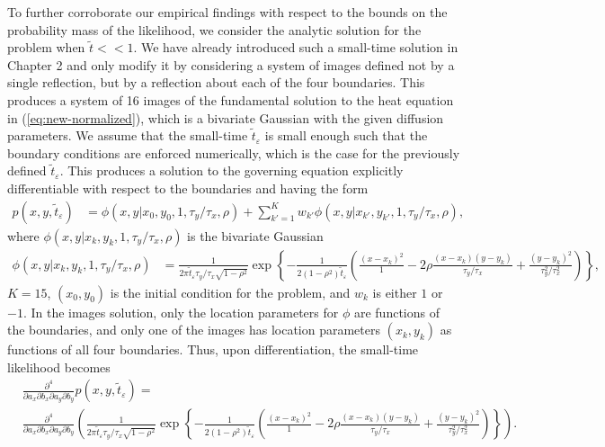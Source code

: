 \documentclass[10pt]{article}
\begin{document}
\begin{enumerate}
To further corroborate our empirical findings with respect to the
bounds on the probability mass of the likelihood, we consider the
analytic solution for the problem when $\tilde{t} << 1$. We have
already introduced such a small-time solution in Chapter 2
and only modify it by considering a system of images defined not by a
single reflection, but by a reflection about each of the four
boundaries. This produces a system of 16 images of the fundamental
solution to the heat equation in (\ref{eq:new-normalized}), which is a
bivariate Gaussian with the given diffusion parameters.  We assume
that the small-time $\tilde{t}_{\varepsilon}$ is small enough such
that the boundary conditions are enforced numerically, which is the
case for the previously defined $\tilde{t}_\varepsilon$. This produces
a solution to the governing equation explicitly differentiable with
respect to the boundaries and having the form
  \begin{align}
    p(x,y,\tilde{t}_\varepsilon) &= \phi(x,y | x_0, y_0, 1, \tau_y/\tau_x, \rho) + \sum_{k' =1}^K
                                   w_{k'} \phi(x,y | x_{k'}, y_{k'}, 1, \tau_y/\tau_x, \rho),
  \end{align}
  where $\phi(x,y | x_k, y_k, 1, \tau_y/\tau_x, \rho)$ is the
  bivariate Gaussian
  \begin{align}
    \phi(x,y | x_k, y_k, 1, \tau_y/\tau_x, \rho) &= \frac{1}{2\pi \tilde{t}_\varepsilon \tau_y/\tau_x \sqrt{1-\rho^2}}  \exp\left\{ -\frac{1}{2(1-\rho^2)\tilde{t}_\varepsilon} \left( \frac{(x - x_k)^2}{1} - 2\rho \frac{(x-x_k)(y-y_k)}{\tau_y/\tau_x} +  \frac{(y - y_k)^2}{\tau_y^2/\tau_x^2}  \right)  \right\},
  \end{align}
  $K=15$, $(x_0, y_0)$ is the initial condition for the problem, and
  $w_k$ is either $1$ or $-1$. In the images solution, only the
  location parameters for $\phi$ are functions of the boundaries, and
  only one of the images has location parameters $(x_k, y_k)$ as functions of all four
  boundaries. Thus, upon differentiation, the small-time likelihood
  becomes
    \begin{align}
      &\frac{\partial^4}{\partial a_x \partial b_x \partial a_y \partial b_y}p(x,y,\tilde{t}_\varepsilon) = \nonumber \\
      &\frac{\partial^4}{\partial a_x \partial b_x \partial a_y \partial b_y} \left( \frac{1}{2\pi \tilde{t}_\varepsilon \tau_y/\tau_x \sqrt{1-\rho^2}}  \exp\left\{ -\frac{1}{2(1-\rho^2)\tilde{t}_\varepsilon} \left( \frac{(x - x_k)^2}{1} - 2\rho \frac{(x-x_k)(y-y_k)}{\tau_y/\tau_x} +  \frac{(y - y_k)^2}{\tau_y^2/\tau_x^2}  \right)  \right\} \right).

\end{align}
\end{enumerate}
\end{document}

